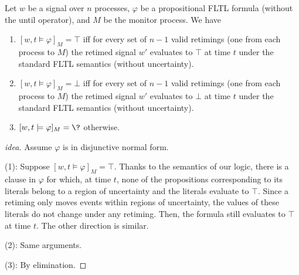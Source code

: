 \begin{claim}
	Let $w$ be a signal over $n$ processes, $\varphi$ be a propositional FLTL formula (without the until operator), and $M$ be the monitor process.
	We have
	\begin{enumerate}
		\item $[w,t \models \varphi]_M = \top$ iff for every set of $n-1$ valid retimings (one from each process to $M$) the retimed signal $w'$ evaluates to $\top$ at time $t$ under the standard FLTL semantics (without uncertainty).
		\item $[w,t \models \varphi]_M = \bot$ iff for every set of $n-1$ valid retimings (one from each process to $M$) the retimed signal $w'$ evaluates to $\bot$ at time $t$ under the standard FLTL semantics (without uncertainty).
		\item $[w,t \models \varphi]_M = \?$ otherwise.
	\end{enumerate}
\end{claim}
\begin{proof}[idea]
	Assume $\varphi$ is in disjunctive normal form.
	
	(1): Suppose $[w,t \models \varphi]_M = \top$.
	Thanks to the semantics of our logic, there is a clause in $\varphi$ for which, at time $t$, none of the propositions corresponding to its literals belong to a region of uncertainty and the literals evaluate to $\top$.
	Since a retiming only moves events within regions of uncertainty, the values of these literals do not change under any retiming.
	Then, the formula still evaluates to $\top$ at time $t$. 
	The other direction is similar.
	
	(2): Same arguments.
	
	(3): By elimination.
	
\end{proof}



